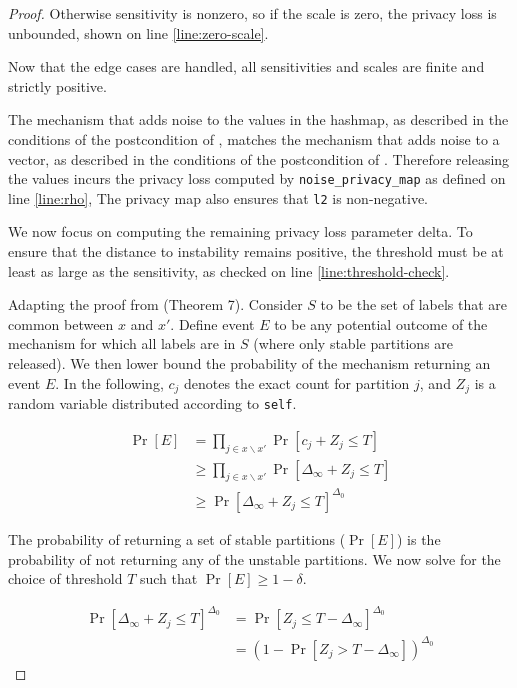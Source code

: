 \documentclass{article}
\begin{document}
\begin{proof}
    Otherwise sensitivity is nonzero, so if the scale is zero,
    the privacy loss is unbounded, shown on line \ref{line:zero-scale}.

    Now that the edge cases are handled, all sensitivities and scales are finite and strictly positive.

    The mechanism that adds noise to the values in the hashmap, as described in the conditions of the postcondition of , 
    matches the mechanism that adds noise to a vector, as described in the conditions of the postcondition of .
    Therefore releasing the values incurs the privacy loss computed by \texttt{noise\_privacy\_map} as defined on line \ref{line:rho},
    The privacy map also ensures that \texttt{l2} is non-negative.

    We now focus on computing the remaining privacy loss parameter delta.
    To ensure that the distance to instability remains positive, 
    the threshold must be at least as large as the sensitivity, as checked on line \ref{line:threshold-check}.

    Adapting the proof from \cite{rogers2023unifyingprivacyanalysisframework} (Theorem 7).
    Consider $S$ to be the set of labels that are common between $x$ and $x'$.
    Define event $E$ to be any potential outcome of the mechanism for which all labels are in $S$
    (where only stable partitions are released).
    We then lower bound the probability of the mechanism returning an event $E$.
    In the following, $c_j$ denotes the exact count for partition $j$,
    and $Z_j$ is a random variable distributed according to \texttt{self}.

    \begin{align*}
        \Pr[E] &= \prod_{j \in x \backslash x'} \Pr[c_j + Z_j \le T] \\
        &\ge \prod_{j \in x \backslash x'} \Pr[\Delta_\infty + Z_j \le T] \\
        &\ge \Pr[\Delta_\infty + Z_j \le T]^{\Delta_0}
    \end{align*}

    The probability of returning a set of stable partitions ($\Pr[E]$) 
    is the probability of not returning any of the unstable partitions.
    We now solve for the choice of threshold $T$ such that $\Pr[E] \ge 1 - \delta$.

    \begin{align*}
        \Pr[\Delta_\infty + Z_j \le T]^{\Delta_0} &= \Pr[Z_j \le T - \Delta_\infty]^{\Delta_0} \\
        &= (1 - \Pr[Z_j > T - \Delta_\infty])^{\Delta_0}
    \end{align*}


\end{proof}
\end{document}
